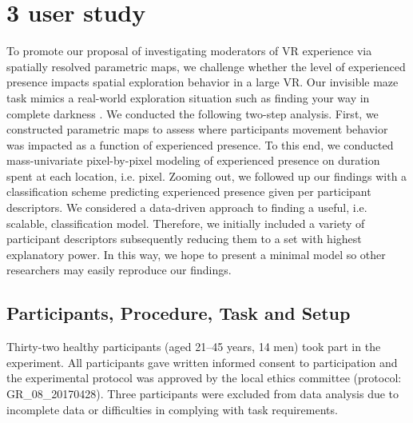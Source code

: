 \section{3 user study}
To promote our proposal of investigating moderators of VR experience via spatially resolved parametric maps, we challenge whether the level of experienced presence impacts spatial exploration behavior in a large VR. Our invisible maze task mimics a real-world exploration situation such as finding your way in complete darkness \cite{}. We conducted the following two-step analysis. First, we constructed parametric maps to assess where participants movement behavior was impacted as a function of experienced presence. To this end, we conducted mass-univariate pixel-by-pixel modeling of experienced presence on duration spent at each location, i.e. pixel. Zooming out, we followed up our findings with a classification scheme predicting experienced presence given per participant descriptors. We considered a data-driven approach to finding a useful, i.e. scalable, classification model. Therefore, we initially included a variety of participant descriptors subsequently reducing them to a set with highest explanatory power. In this way, we hope to present a minimal model so other researchers may easily reproduce our findings. 


\subsection{Participants, Procedure, Task and Setup} Thirty-two healthy participants (aged 21--45 years, 14 men) took part in the experiment. All participants gave written informed consent to participation and the experimental protocol was approved by the local ethics committee (protocol: GR\_08\_20170428). Three participants were excluded from data analysis due to incomplete data or difficulties in complying with task requirements.

